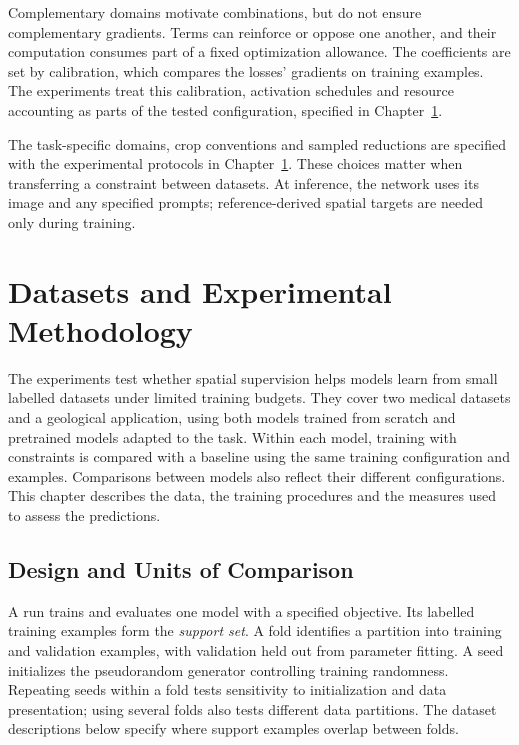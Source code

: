 \documentclass[12pt,a4paper]{article}
\begin{document}
Complementary domains motivate combinations, but do not ensure complementary
gradients. Terms can reinforce or oppose one another, and their computation
consumes part of a fixed optimization allowance. The coefficients are set by
calibration, which compares the losses' gradients on training examples. The
experiments treat this calibration, activation schedules and resource
accounting as parts of the tested configuration, specified in
Chapter~\ref{sec:methodology}.

The task-specific domains, crop conventions and sampled reductions
are specified with the experimental protocols in
Chapter~\ref{sec:methodology}. These choices matter when transferring a
constraint between datasets. At inference, the network uses its image
and any specified prompts; reference-derived spatial targets are needed
only during training.

\clearpage
\section{Datasets and Experimental Methodology}
\label{sec:methodology}

The experiments test whether spatial supervision helps models learn from
small labelled datasets under limited training budgets. They cover two
medical datasets and a geological application, using both models trained
from scratch and pretrained models adapted to the task. Within each model,
training with constraints is compared with a baseline using the same
training configuration and examples. Comparisons between models also
reflect their different configurations. This chapter describes the data,
the training procedures and the measures used to assess the predictions.

\subsection{Design and Units of Comparison}
\label{sec:experimental-structure}

A run trains and evaluates one model with a specified objective. Its
labelled training examples form the \emph{support set}. A fold identifies
a partition into training and validation examples, with validation held
out from parameter fitting. A seed initializes the pseudorandom generator
controlling training randomness. Repeating seeds within a fold tests
sensitivity to initialization and data presentation; using several folds
also tests different data partitions. The dataset descriptions below
specify where support examples overlap between folds.
\end{document}

